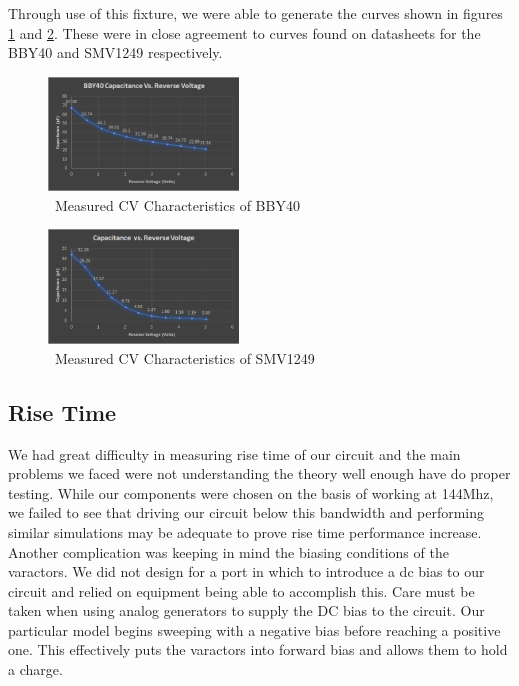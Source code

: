 \documentclass[journal]{IEEEtran}
\begin{document}
Through use of this fixture, we were able to generate the curves shown in figures \ref{fig:BBY40CV} and \ref{fig:SMV1249CV}. These were in close agreement to curves found on datasheets for the BBY40 and SMV1249 respectively.
 
\begin{figure}[htb]
\centering
\includegraphics[width=0.45\textwidth]{bbY40CV}
\caption{\ Measured CV Characteristics of BBY40 
}\label{fig:BBY40CV}
\end{figure}
 
 
\begin{figure}[htb]
\centering
\includegraphics[width=0.45\textwidth]{SMV1249_CV}
\caption{\ Measured CV Characteristics of SMV1249 
}\label{fig:SMV1249CV}
\end{figure}




\subsection{Rise Time}

We had great difficulty in measuring rise time of our circuit and the main problems we faced were not understanding the theory well enough have do proper testing. While our components were chosen on the basis of working at 144Mhz, we failed to see that driving our circuit below this bandwidth and performing similar simulations may be adequate to prove rise time performance increase. Another complication was keeping in mind the biasing conditions of the varactors. We did not design for a port in which to introduce a dc bias to our circuit and relied on equipment being able to accomplish this. Care must be taken when using analog generators to supply the DC bias to the circuit. Our particular model begins sweeping with a negative bias before reaching a positive one. This effectively puts the varactors into forward bias and allows them to hold a charge. 
\end{document}
